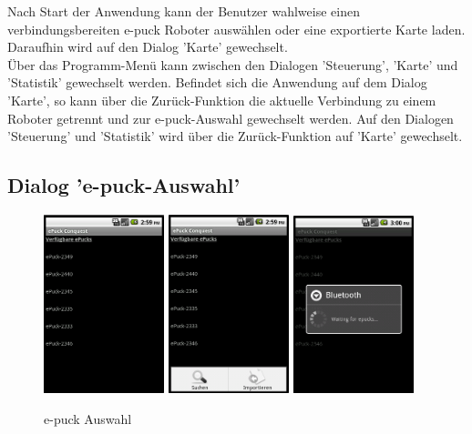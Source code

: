 \documentclass[10pt,a4paper]{article}
\begin{document}
  			Nach Start der Anwendung kann der Benutzer wahlweise einen verbindungsbereiten e-puck Roboter auswählen oder eine
  			exportierte Karte laden. Daraufhin wird auf den Dialog 'Karte' gewechselt. \\
  			Über das Programm-Menü kann zwischen den Dialogen 'Steuerung', 'Karte' und 'Statistik' gewechselt werden. Befindet sich die
  			Anwendung auf dem Dialog 'Karte', so kann über die Zurück-Funktion die aktuelle Verbindung zu einem Roboter getrennt
  			und zur  e-puck-Auswahl gewechselt werden. Auf den Dialogen 'Steuerung' und 'Statistik' wird über die Zurück-Funktion
  			auf 'Karte' gewechselt.
  			
  			\subsection{Dialog 'e-puck-Auswahl'}
  			
			\begin{figure}[h]
				  \centering
				\includegraphics[width=3.5cm]{screenshots_neu/start.png}
				\includegraphics[width=3.5cm]{screenshots_neu/start_menu.png}
				\includegraphics[width=3.5cm]{screenshots_neu/start_btsuche.png}
  				\caption{e-puck Auswahl}
  			\end{figure}	  				
  			
\end{document}

